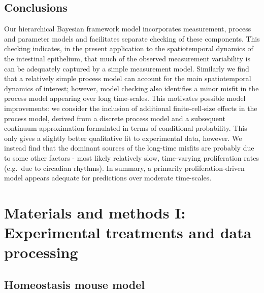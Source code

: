 \documentclass[10pt,letterpaper]{article}
\providecommand{\DIFaddtex}[1]{{\protect\color{blue} \sf #1}} %
\providecommand{\DIFdeltex}[1]{{\protect\color{red} \scriptsize #1}} %
\providecommand{\DIFaddbegin}{} %
\providecommand{\DIFaddend}{} %
\providecommand{\DIFdelbegin}{} %
\providecommand{\DIFdelend}{} %
\providecommand{\DIFadd}[1]{\texorpdfstring{\DIFaddtex{#1}}{#1}} %
\providecommand{\DIFdel}[1]{\texorpdfstring{\DIFdeltex{#1}}{}} %
\begin{document}
\subsection{Conclusions}\label{conclusions}

Our hierarchical Bayesian \DIFdelbegin \DIFdel{framework }\DIFdelend \DIFaddbegin \DIFadd{model }\DIFaddend incorporates measurement, process and
parameter models and facilitates separate checking of these components.
This checking indicates, in the present application to the
spatiotemporal dynamics of the intestinal epithelium, that much of the
observed measurement variability \DIFdelbegin \DIFdel{is }\DIFdelend \DIFaddbegin \DIFadd{can be }\DIFaddend adequately captured by a simple
measurement model. Similarly we find that a relatively simple process
model can account for the main spatiotemporal dynamics of interest;
however, model checking also identifies a minor misfit in the process
model appearing over long time-scales. This motivates possible model
improvements: we consider the inclusion of additional finite-cell-size
effects in the process model, derived from a discrete process model and
a subsequent continuum approximation formulated in terms of conditional
probability. This only gives a slightly better qualitative fit to
experimental data, however. We instead find that the dominant sources of
the long-time misfits are probably due to some other factors - most
likely relatively slow, time-varying proliferation rates (e.g.~due to
circadian rhythms). In summary, a primarily proliferation-driven model
appears adequate for predictions over moderate time-scales.

\section{Materials and methods I: Experimental treatments and data
processing}\label{materials-and-methods-i-experimental-treatments-and-data-processing}

\subsection{Homeostasis mouse model}\label{homeostasis-mouse-model}
\end{document}
